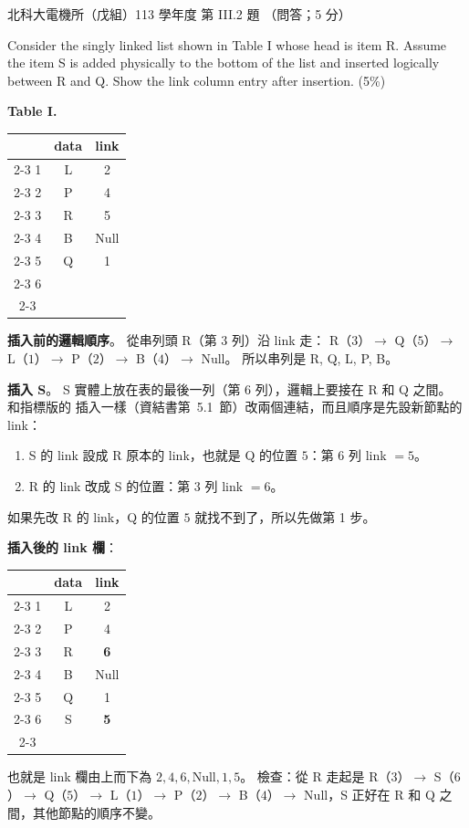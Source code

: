 \begin{pastexam}[label={px:ntut-113-ee-ds-11}]{北科大電機所（戊組）113 學年度 第 III.2 題}
（問答；5 分）

Consider the singly linked list shown in Table I whose head is item R. Assume the item S is added
physically to the bottom of the list and inserted logically between R and Q. Show the link column
entry after insertion. (5\%)

\begin{center}
\textbf{Table I.}\\
\begin{tabular}{c|c|c|}
\multicolumn{1}{c}{} & \multicolumn{1}{c}{data} & \multicolumn{1}{c}{link}\\\cline{2-3}
1 & L & 2\\\cline{2-3}
2 & P & 4\\\cline{2-3}
3 & R & 5\\\cline{2-3}
4 & B & Null\\\cline{2-3}
5 & Q & 1\\\cline{2-3}
6 & & \\\cline{2-3}
\end{tabular}
\end{center}
\end{pastexam}

\begin{pastsoln}
\textbf{插入前的邏輯順序}。 從串列頭 R（第 $3$ 列）沿 link 走：
R（$3$）$\to$ Q（$5$）$\to$ L（$1$）$\to$ P（$2$）$\to$ B（$4$）$\to$ Null。
所以串列是 R, Q, L, P, B。

\textbf{插入 S}。 S 實體上放在表的最後一列（第 $6$ 列），邏輯上要接在 R 和 Q 之間。 和指標版的
插入一樣（資結書第~5.1~節）改兩個連結，而且順序是先設新節點的 link：
\begin{enumerate}
\item S 的 link 設成 R 原本的 link，也就是 Q 的位置 $5$：第 $6$ 列 link $= 5$。
\item R 的 link 改成 S 的位置：第 $3$ 列 link $= 6$。
\end{enumerate}
如果先改 R 的 link，Q 的位置 $5$ 就找不到了，所以先做第 1 步。

\textbf{插入後的 link 欄}：
\begin{center}
\begin{tabular}{c|c|c|}
\multicolumn{1}{c}{} & \multicolumn{1}{c}{data} & \multicolumn{1}{c}{link}\\\cline{2-3}
1 & L & 2\\\cline{2-3}
2 & P & 4\\\cline{2-3}
3 & R & \textbf{6}\\\cline{2-3}
4 & B & Null\\\cline{2-3}
5 & Q & 1\\\cline{2-3}
6 & S & \textbf{5}\\\cline{2-3}
\end{tabular}
\end{center}
也就是 link 欄由上而下為 $2, 4, 6, \text{Null}, 1, 5$。 檢查：從 R 走起是
R（$3$）$\to$ S（$6$）$\to$ Q（$5$）$\to$ L（$1$）$\to$ P（$2$）$\to$ B（$4$）$\to$ Null，S 正好在 R 和
Q 之間，其他節點的順序不變。
\end{pastsoln}
